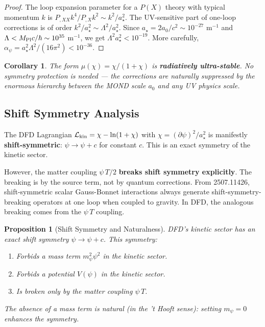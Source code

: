 \documentclass[11pt,a4paper]{article}
\newtheorem{proposition}{Proposition}
\newtheorem{corollary}{Corollary}
\begin{document}
\begin{proof}
The loop expansion parameter for a $P(X)$ theory with typical momentum $k$ is $P_{,XX}k^4 / P_{,X}k^2 \sim k^2/a_\star^2$. The UV-sensitive part of one-loop corrections is of order $k^2/a_\star^2 \sim \Lambda^2/a_\star^2$. Since $a_\star = 2a_0/c^2 \sim 10^{-27}$ m$^{-1}$ and $\Lambda < M_{\rm Pl}c/\hbar \sim 10^{35}$ m$^{-1}$, we get $\Lambda^2 a_\star^2 < 10^{-19}$. More carefully, $\alpha_\psi = a_\star^2\Lambda^2/(16\pi^2) < 10^{-36}$.
\end{proof}

\begin{corollary}
The form $\mu(\chi) = \chi/(1+\chi)$ is \textbf{radiatively ultra-stable}. No symmetry protection is needed --- the corrections are naturally suppressed by the enormous hierarchy between the MOND scale $a_0$ and any UV physics scale.
\end{corollary}

\subsection{Shift Symmetry Analysis}
\label{sec:shift-symmetry}

The DFD Lagrangian $\mathcal{L}_{\rm kin} = \chi - \ln(1+\chi)$ with $\chi = (\partial\psi)^2/a_\star^2$ is manifestly \textbf{shift-symmetric}: $\psi \to \psi + c$ for constant $c$. This is an exact symmetry of the kinetic sector.

However, the matter coupling $\psi\,T/2$ \textbf{breaks shift symmetry explicitly}. The breaking is by the source term, not by quantum corrections. From 2507.11426, shift-symmetric scalar Gauss-Bonnet interactions always generate shift-symmetry-breaking operators at one loop when coupled to gravity. In DFD, the analogous breaking comes from the $\psi\,T$ coupling.

\begin{proposition}[Shift Symmetry and Naturalness]
DFD's kinetic sector has an exact shift symmetry $\psi \to \psi + c$. This symmetry:
\begin{enumerate}
\item Forbids a mass term $m_\psi^2\psi^2$ in the kinetic sector.
\item Forbids a potential $V(\psi)$ in the kinetic sector.
\item Is broken only by the matter coupling $\psi\,T$.
\end{enumerate}
The absence of a mass term is natural (in the 't Hooft sense): setting $m_\psi = 0$ enhances the symmetry.
\end{proposition}
\end{document}
